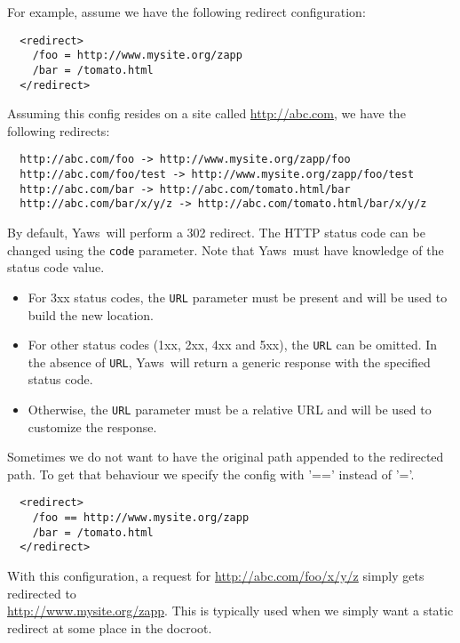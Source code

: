 \documentclass[11pt,oneside,english]{book}
\newcommand{\Yaws}            %
        {{\sc Yaws}}
\begin{document}
\begin{itemize}
              For example, assume we have the following redirect configuration:
\begin{verbatim}
  <redirect>
    /foo = http://www.mysite.org/zapp
    /bar = /tomato.html
  </redirect>
\end{verbatim}
              Assuming this config resides on a site called
              \url{http://abc.com}, we have the following redirects:
\begin{verbatim}
  http://abc.com/foo -> http://www.mysite.org/zapp/foo
  http://abc.com/foo/test -> http://www.mysite.org/zapp/foo/test
  http://abc.com/bar -> http://abc.com/tomato.html/bar
  http://abc.com/bar/x/y/z -> http://abc.com/tomato.html/bar/x/y/z
\end{verbatim}

              By default, \Yaws\ will perform a 302 redirect. The HTTP
              status code can be changed using the \verb+code+
              parameter. Note that \Yaws\ must have knowledge of the status
              code value.
              \begin{itemize}
              \item For 3xx status codes, the \verb+URL+ parameter must be
                present and will be used to build the new location.
              \item For other status codes (1xx, 2xx, 4xx and 5xx), the
                \verb+URL+ can be omitted. In the absence of \verb+URL+,
                \Yaws\ will return a generic response with the specified
                status code.
              \item Otherwise, the \verb+URL+ parameter must be a relative
                URL and will be used to customize the response.
              \end{itemize}
              Sometimes we do not want to have the original path appended to the
              redirected path. To get that behaviour we specify the config with
              '==' instead of '='.
\begin{verbatim}
  <redirect>
    /foo == http://www.mysite.org/zapp
    /bar = /tomato.html
  </redirect>
\end{verbatim}
              With this configuration, a request for
              \url{http://abc.com/foo/x/y/z} simply gets redirected to \\
              \url{http://www.mysite.org/zapp}. This is typically used when
              we simply want a static redirect at some place in the
              docroot.


\end{itemize}
\end{document}
